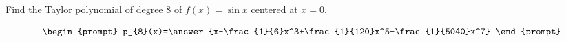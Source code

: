 \documentclass{ximera}
\author{Gregory Hartman \and Matthew Carr}
\begin{document}
\begin{exercise}




Find the Taylor polynomial of degree $8$ of $f(x)=\sin x$ centered at $x=0$.

\[
\begin{prompt}
p_{8}(x)=\answer{x-\frac{1}{6}x^3+\frac{1}{120}x^5-\frac{1}{5040}x^7}
\end{prompt}
\]

\end{exercise}
\end{document}
